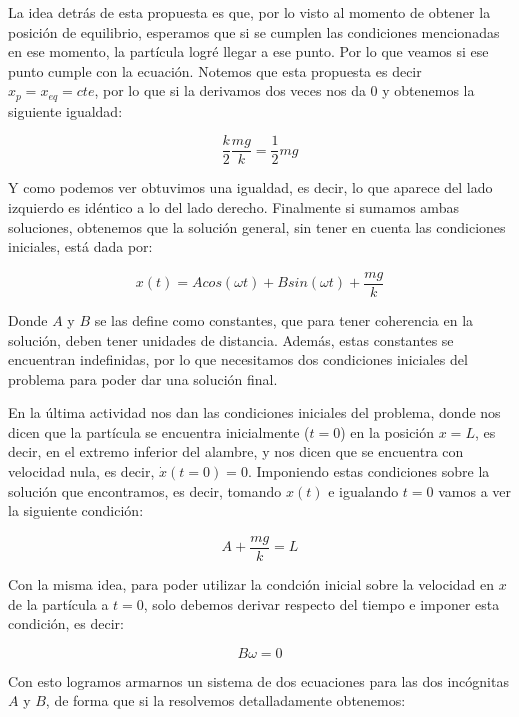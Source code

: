 \documentclass{article}
\begin{document}
\begin{multicols}{2}
La idea detrás de esta propuesta es que, por lo visto al momento de obtener la posición de equilibrio, esperamos que si se cumplen las condiciones mencionadas en ese momento, la partícula logré llegar a ese punto. Por lo que veamos si ese punto cumple con la ecuación. Notemos que esta propuesta es decir $x_p = x_{eq} = cte$, por lo que si la derivamos dos veces nos da $0$ y obtenemos la siguiente igualdad:

\begin{equation}
    \frac{k}{2} \frac{mg}{k} = \frac{1}{2}mg
\end{equation}

Y como podemos ver obtuvimos una igualdad, es decir, lo que aparece del lado izquierdo es idéntico a lo del lado derecho. Finalmente si sumamos ambas soluciones, obtenemos que la solución general, sin tener en cuenta las condiciones iniciales, está dada por:

\begin{equation}
    x(t) = Acos(\omega t) + Bsin(\omega t) + \frac{mg}{k}
\end{equation}

Donde $A$ y $B$ se las define como constantes, que para tener coherencia en la solución, deben tener unidades de distancia. Además, estas constantes se encuentran indefinidas, por lo que necesitamos dos condiciones iniciales del problema para poder dar una solución final.

En la última actividad nos dan las condiciones iniciales del problema, donde nos dicen que la partícula se encuentra inicialmente ($t = 0$) en la posición $x = L$, es decir, en el extremo inferior del alambre, y nos dicen que se encuentra con velocidad nula, es decir, $\dot{x}(t = 0) = 0$. Imponiendo estas condiciones sobre la solución que encontramos, es decir, tomando $x(t)$ e igualando $t = 0$ vamos a ver la siguiente condición:

\begin{equation}
    A + \frac{mg}{k} = L
\end{equation}

Con la misma idea, para poder utilizar la condción inicial sobre la velocidad en $x$ de la partícula a $t= 0$, solo debemos derivar respecto del tiempo e imponer esta condición, es decir:

\begin{equation}
    B\omega = 0
\end{equation}

Con esto logramos armarnos un sistema de dos ecuaciones para las dos incógnitas $A$ y $B$, de forma que si la resolvemos detalladamente obtenemos:


\end{multicols}
\end{document}
